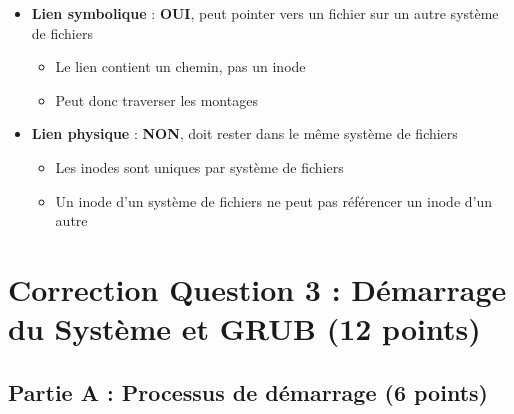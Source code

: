 \documentclass[12pt,a4paper]{article}
\begin{document}
\begin{answerbox}
\begin{itemize}
    \item \textbf{Lien symbolique} : \textbf{OUI}, peut pointer vers un fichier sur un autre système de fichiers
    \begin{itemize}
        \item Le lien contient un chemin, pas un inode
        \item Peut donc traverser les montages
    \end{itemize}
    \item \textbf{Lien physique} : \textbf{NON}, doit rester dans le même système de fichiers
    \begin{itemize}
        \item Les inodes sont uniques par système de fichiers
        \item Un inode d'un système de fichiers ne peut pas référencer un inode d'un autre
    \end{itemize}
\end{itemize}
\end{answerbox}

\newpage


\section{Correction Question 3 : Démarrage du Système et GRUB (12 points)}

\subsection*{Partie A : Processus de démarrage (6 points)}
\end{document}
